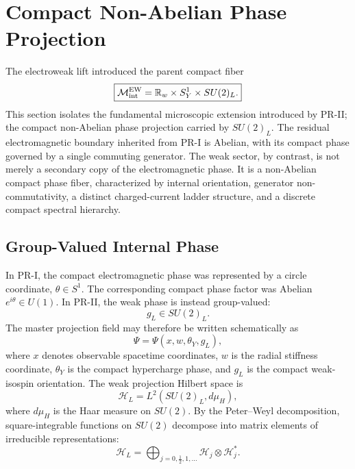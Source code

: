 \documentclass[11pt]{article}
\begin{document}
\section{Compact Non-Abelian Phase Projection}
\label{sec:pr2_compact_nonabelian_phase_projection}

The electroweak lift introduced the parent compact fiber
\begin{equation}
\boxed{
\mathcal M_{\rm int}^{\rm EW}
=
\mathbb R_w
\times
S_Y^1
\times
SU(2)_L.
}
\end{equation}
This section isolates the fundamental microscopic extension introduced by PR-II; the compact non-Abelian phase projection carried by $SU(2)_L$. The residual electromagnetic boundary inherited from PR-I is Abelian, with its compact phase governed by a single commuting generator. The weak sector, by contrast, is not merely a secondary copy of the electromagnetic phase. It is a non-Abelian compact phase fiber, characterized by internal orientation, generator non-commutativity, a distinct charged-current ladder structure, and a discrete compact spectral hierarchy.

\subsection{Group-Valued Internal Phase}
\label{sec:pr2_group_valued_internal_phase}

In PR-I, the compact electromagnetic phase was represented by a circle coordinate,
$\theta\in S^1$. The corresponding compact phase factor was Abelian $e^{i\theta}\in U(1)$. In PR-II, the weak phase is instead group-valued:
\begin{equation}
\boxed{
g_L
\in
SU(2)_L.
}
\end{equation}
The master projection field may therefore be written schematically as
\begin{equation}
\boxed{
\Psi
=
\Psi(x,w,\theta_Y,g_L),
}
\end{equation}
where \(x\) denotes observable spacetime coordinates, \(w\) is the radial stiffness coordinate, \(\theta_Y\) is the compact hypercharge phase, and \(g_L\) is the compact weak-isospin orientation. The weak projection Hilbert space is
\begin{equation}
\mathcal H_L
=
L^2(SU(2)_L,d\mu_H),
\end{equation}
where \(d\mu_H\) is the Haar measure on \(SU(2)\). 
By the Peter--Weyl decomposition, square-integrable functions on \(SU(2)\) decompose into matrix elements of irreducible representations:
\begin{equation}
\mathcal H_L
=
\bigoplus_{j=0,\frac12,1,\ldots}
\mathcal H_j\otimes\mathcal H_j^*.
\end{equation}
\end{document}

